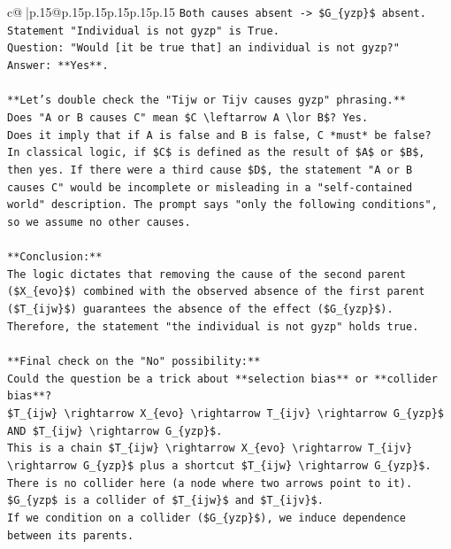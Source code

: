 \documentclass{article}
\begin{document}
{\begin{supertabular}{c@{$\;$}|p{.15\linewidth}@{}p{.15\linewidth}p{.15\linewidth}p{.15\linewidth}p{.15\linewidth}p{.15\linewidth}}
{{{\texttt{Both causes absent {-}> \$G\_\{yzp\}\$ absent.} \\
\texttt{Statement "Individual is not gyzp" is True.} \\
\texttt{Question: "Would {[}it be true that{]} an individual is not gyzp?"} \\
\texttt{Answer: **Yes**.} \\
\\ 
\texttt{**Let's double check the "Tijw or Tijv causes gyzp" phrasing.**} \\
\texttt{Does "A or B causes C" mean \$C \textbackslash{}leftarrow A \textbackslash{}lor B\$? Yes.} \\
\texttt{Does it imply that if A is false and B is false, C *must* be false?} \\
\texttt{In classical logic, if \$C\$ is defined as the result of \$A\$ or \$B\$, then yes. If there were a third cause \$D\$, the statement "A or B causes C" would be incomplete or misleading in a "self{-}contained world" description. The prompt says "only the following conditions", so we assume no other causes.} \\
\\ 
\texttt{**Conclusion:**} \\
\texttt{The logic dictates that removing the cause of the second parent (\$X\_\{evo\}\$) combined with the observed absence of the first parent (\$T\_\{ijw\}\$) guarantees the absence of the effect (\$G\_\{yzp\}\$). Therefore, the statement "the individual is not gyzp" holds true.} \\
\\ 
\texttt{**Final check on the "No" possibility:**} \\
\texttt{Could the question be a trick about **selection bias** or **collider bias**?} \\
\texttt{\$T\_\{ijw\} \textbackslash{}rightarrow X\_\{evo\} \textbackslash{}rightarrow T\_\{ijv\} \textbackslash{}rightarrow G\_\{yzp\}\$ AND \$T\_\{ijw\} \textbackslash{}rightarrow G\_\{yzp\}\$.} \\
\texttt{This is a chain \$T\_\{ijw\} \textbackslash{}rightarrow X\_\{evo\} \textbackslash{}rightarrow T\_\{ijv\} \textbackslash{}rightarrow G\_\{yzp\}\$ plus a shortcut \$T\_\{ijw\} \textbackslash{}rightarrow G\_\{yzp\}\$.} \\
\texttt{There is no collider here (a node where two arrows point to it). \$G\_\{yzp\$ is a collider of \$T\_\{ijw\}\$ and \$T\_\{ijv\}\$.} \\
\texttt{If we condition on a collider (\$G\_\{yzp\}\$), we induce dependence between its parents.} \\
}}}
\end{supertabular}}
\end{document}
